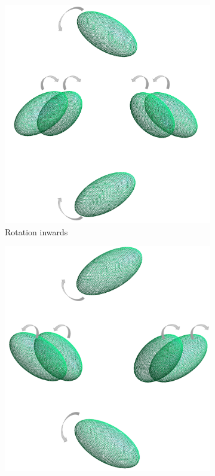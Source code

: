 \begin{figure}[H]
\begin{subfigure}{.5\linewidth}
                \includegraphics[scale = 0.4]{figures/6_ellip_in}
                \caption{Rotation inwards}
                \label{Rotation}
                \end{subfigure}%
                \begin{subfigure}{.5\linewidth}
                \centering
                \includegraphics[scale = 0.4]{figures/6_ellip_out}

\end{subfigure}
\end{figure}

